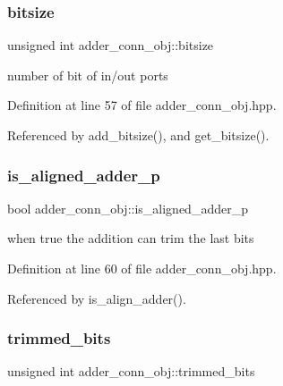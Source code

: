 \subsubsection{\texorpdfstring{bitsize}{bitsize}}
{\footnotesize\ttfamily unsigned int adder\+\_\+conn\+\_\+obj\+::bitsize\hspace{0.3cm}{\ttfamily [private]}}



number of bit of in/out ports 



Definition at line 57 of file adder\+\_\+conn\+\_\+obj.\+hpp.



Referenced by add\+\_\+bitsize(), and get\+\_\+bitsize().

\mbox{\label{classadder__conn__obj_a0dda9606f4dba1377d28d01ef3343c8c}} 
\subsubsection{\texorpdfstring{is\+\_\+aligned\+\_\+adder\+\_\+p}{is\_aligned\_adder\_p}}
{\footnotesize\ttfamily bool adder\+\_\+conn\+\_\+obj\+::is\+\_\+aligned\+\_\+adder\+\_\+p\hspace{0.3cm}{\ttfamily [private]}}



when true the addition can trim the last bits 



Definition at line 60 of file adder\+\_\+conn\+\_\+obj.\+hpp.



Referenced by is\+\_\+align\+\_\+adder().

\mbox{\label{classadder__conn__obj_adeafa67ddf9e45946ebb0043c8cbef28}} 
\subsubsection{\texorpdfstring{trimmed\+\_\+bits}{trimmed\_bits}}
{\footnotesize\ttfamily unsigned int adder\+\_\+conn\+\_\+obj\+::trimmed\+\_\+bits\hspace{0.3cm}{\ttfamily [private]}}



